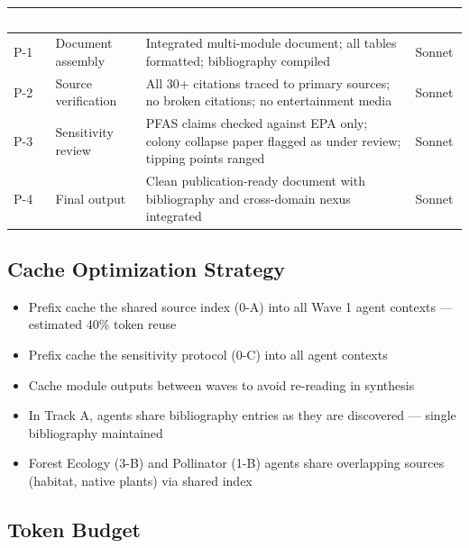 \documentclass[11pt,letterpaper]{article}
\newcommand{\tableheader}[1]{\textbf{\sffamily\textcolor{white}{#1}}}
\begin{document}
\begin{center}
\begin{tabularx}{\textwidth}{L{2cm}L{3.5cm}XC{1.5cm}}
\toprule
{}
\tableheader{Task} & \tableheader{Output} & \tableheader{Spec} & \tableheader{Model} \\
\midrule
P-1 & Document assembly & Integrated multi-module document; all tables formatted; bibliography compiled & Sonnet \\
P-2 & Source verification & All 30+ citations traced to primary sources; no broken citations; no entertainment media & Sonnet \\
P-3 & Sensitivity review & PFAS claims checked against EPA only; colony collapse paper flagged as under review; tipping points ranged & Sonnet \\
P-4 & Final output & Clean publication-ready document with bibliography and cross-domain nexus integrated & Sonnet \\
\bottomrule
\end{tabularx}
\end{center}

\subsection{Cache Optimization Strategy}

\begin{itemize}[leftmargin=*]
  \item Prefix cache the shared source index (0-A) into all Wave 1 agent contexts --- estimated 40\% token reuse
  \item Prefix cache the sensitivity protocol (0-C) into all agent contexts
  \item Cache module outputs between waves to avoid re-reading in synthesis
  \item In Track A, agents share bibliography entries as they are discovered --- single bibliography maintained
  \item Forest Ecology (3-B) and Pollinator (1-B) agents share overlapping sources (habitat, native plants) via shared index
\end{itemize}

\subsection{Token Budget}
\end{document}
